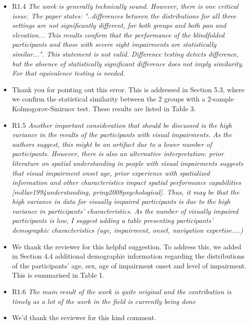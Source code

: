 \documentclass{scrartcl}
\begin{document}
\begin{itemize}
  \item R1.4 \textit{The work is generally technically sound. However, there is one critical issue. The paper states: "..differences between the distributions for all three settings are not significantly different, for both groups and both pan and elevation... This results confirm that the performance of the blindfolded participants and those with severe sight impairments are statistically similar...".
    This statement is not valid. Difference testing detects difference, but the absence of statistically significant difference does not imply similarity. For that equivalence testing is needed.}
  \item[] Thank you for pointing out this error.
    This is addressed in Section 5.3, where we confirm the statistical similarity between the 2 groups with a 2-sample Kolmogorov-Smirnov test. 
    These results are listed in Table 3.

  \item R1.5 \textit{Another important consideration that should be discussed is the high variance in the results of the participants with visual impairments. As the authors suggest, this might be an artifact due to a lower number of participants. However, there is also an alternative interpretation: prior literature on spatial understanding in people with visual impairments suggests that visual impairment onset age, prior experience with spatialized information and other characteristics impact spatial performance capabilities [millar1994understanding, pring2008psychological]. Thus, it may be that the high variance in data for visually impaired participants is due to the high variance in participants' characteristics. As the number of visually impaired participants is low, I suggest adding a table presenting participants' demographic characteristics (age, impairment, onset, navigation expertise....)}
  \item[] We thank the reviewer for this helpful suggestion.
    To address this, we added in Section 4.4 additional demographic information regarding the distributions of the participants' age, sex, age of impairment onset and level of impairment.
    This is summarised in Table 1. 

  \item R1.6 \textit{The main result of the work is quite original and the contribution is timely as a lot of the work in the field is currently being done}
  \item[] We'd thank the reviewer for this kind comment. 

\end{itemize}
\end{document}
